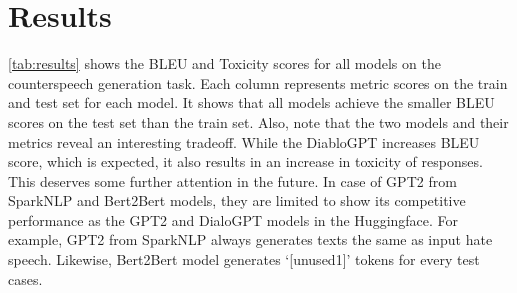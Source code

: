 \documentclass[10pt,twocolumn]{article}
\begin{document}
\section{Results}
\begin{table}
    \centering
    \caption{Results of GPT2 and DialoGPT}
    \label{tab:results}
\end{table}

\autoref{tab:results} shows the BLEU and Toxicity scores for all models on the counterspeech generation task. Each column represents metric scores on the train and test set for each model. It shows that all models achieve the smaller BLEU scores on the test set than the train set. Also, note that the two models and their metrics reveal an interesting tradeoff. While the DiabloGPT increases BLEU score, which is expected, it also results in an increase in toxicity of responses. This deserves some further attention in the future.
In case of GPT2 from SparkNLP and Bert2Bert models, they are limited to show its competitive performance as the GPT2 and DialoGPT models in the Huggingface. For example, GPT2 from SparkNLP always generates texts the same as input hate speech. Likewise, Bert2Bert model generates ‘[unused1]’ tokens for every test cases.
\end{document}
